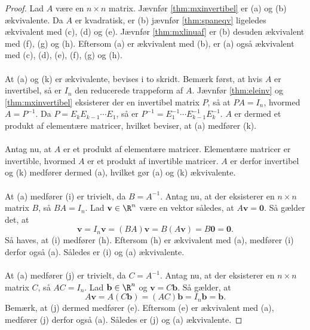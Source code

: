 \begin{proof}
Lad $A$ være en $n \times n$ matrix.
Jævnfør \ref{thm:mxinvertibel} er (a) og (b) ækvivalente. 
Da $A$ er kvadratisk, er (b) jævnfør \ref{thm:spaneqv} ligeledes ækvivalent med (c), (d) og (e). 
Jævnfør \ref{thm:mxlinuaf} er (b) desuden ækvivalent med (f), (g) og (h). 
Eftersom (a) er ækvivalent med (b), er (a) også ækvivalent med (c), (d), (e), (f), (g) og (h). 
\\\\
At (a) og (k) er ækvivalente, bevises i to skridt. 
Bemærk først, at hvis $A$ er invertibel, så er $I_n$ den reducerede trappeform af $A$. 
Jævnfør \ref{thm:eleinv} og \ref{thm:mxinvertibel} eksisterer der en invertibel matrix $P$, så at $PA=I_n$, hvormed $A=P^{-1}$. 
Da $P=E_kE_{k-1} \cdots E_1$, så er $P^{-1}=E_1^{-1} \cdots E_{k-1}^{-1}E_k^{-1}$.
$A$ er dermed et produkt af elementære matricer, hvilket beviser, at (a) medfører (k). \\\\
Antag nu, at $A$ er et produkt af elementære matricer. 
Elementære matricer er invertible, hvormed $A$ er et produkt af invertible matricer. 
$A$ er derfor invertibel og (k) medfører dermed (a), hvilket gør (a) og (k) ækvivalente. 
\\\\
At (a) medfører (i) er trivielt, da $B = A^{-1}$. 
Antag nu, at der eksisterer en $n \times n$ matrix $B$, så $BA=I_n$. Lad $\textbf{v} \in \R^n$ være en vektor således, at $A\textbf{v}=\textbf{0}$. Så gælder det, at 
$$
\textbf{v} = I_n\textbf{v} = (BA)\textbf{v} = B(A\textbf{v}) = B\textbf{0} = \textbf{0}.
$$
Så haves, at (i) medfører (h).
Eftersom (h) er ækvivalent med (a), medfører (i) derfor også (a).
Således er (i) og (a) ækvivalente. 
\\\\
At (a) medfører (j) er trivielt, da $C=A^{-1}$.
Antag nu, at der eksisterer en $n \times n$ matrix $C$, så $AC=I_n$. 
Lad $\textbf{b} \in \R^n$ og $\textbf{v}=C\textbf{b}$. 
Så gælder, at 
$$
A\textbf{v} = A(C\textbf{b}) = (AC)\textbf{b} = I_n\textbf{b} = \textbf{b}.
$$
Bemærk, at (j) dermed medfører (e).
Eftersom (e) er ækvivalent med (a), medfører (j) derfor også (a).
Således er (j) og (a) ækvivalente.
\end{proof}